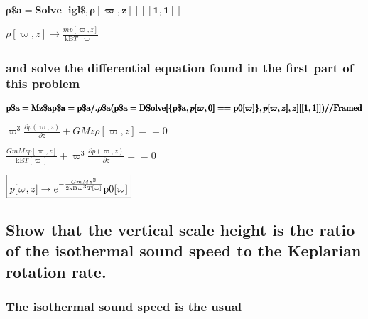 \documentclass{article}
\begin{document}
\begin{doublespace}
\noindent\(\pmb{\text{$\rho \$$a} = \text{Solve}[\text{igl$\$$}, \rho [\varpi ,z]][[1,1]]}\)
\end{doublespace}

\begin{doublespace}
\noindent\(\rho [\varpi ,z]\to \frac{m p[\varpi ,z]}{\text{kB} T[\varpi ]}\)
\end{doublespace}

\subsubsection*{and solve the differential equation found in the first part of this problem}

\begin{doublespace}
\noindent\(\pmb{\text{p$\$$a} = \text{Mz$\$$a}}\\
\pmb{\text{p$\$$a}= \text{p$\$$a}\text{/.} \text{$\rho \$$a}}\\
\pmb{(\text{p$\$$a} = \text{DSolve}[\{\text{p$\$$a} , p[\varpi ,0] == \text{p0}[\varpi ]\},p[\varpi ,z],z][[1,1]]) \text{//}\text{Framed}}\)
\end{doublespace}

\begin{doublespace}
\noindent\(\varpi ^3 \frac{\partial p(\varpi ,z)}{\partial z}+G M z \rho [\varpi ,z]==0\)
\end{doublespace}

\begin{doublespace}
\noindent\(\frac{G m M z p[\varpi ,z]}{\text{kB} T[\varpi ]}+\varpi ^3 \frac{\partial p(\varpi ,z)}{\partial z}==0\)
\end{doublespace}

\begin{doublespace}
\noindent\(\fbox{$p[\varpi ,z]\to e^{-\frac{G m M z^2}{2 \text{kB} \varpi ^3 T[\varpi ]}} \text{p0}[\varpi ]$}\)
\end{doublespace}

\subsection*{Show that the vertical scale height is the ratio of the isothermal sound speed to the Keplarian rotation rate.}

\subsubsection*{The isothermal sound speed is the usual}
\end{document}
